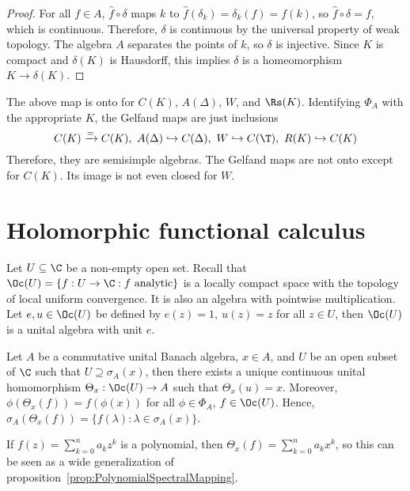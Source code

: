 \documentclass[a4paper]{article}
\begin{document}
\begin{proof}
  For all $f\in A$, $\hat{f}\circ\delta$ maps $k$ to $\hat{f}(\delta_k)=\delta_k(f)=f(k)$, so $\hat{f}\circ\delta=f$, which is continuous. Therefore, $\delta$ is continuous by the universal property of weak topology. The algebra $A$ separates the points of $k$, so $\delta$ is injective. Since $K$ is compact and $\delta(K)$ is Hausdorff, this implies $\delta$ is a homeomorphism $K\to\delta(K)$.
\end{proof}

\begin{eg}
  The above map is onto for $C(K)$, $A(\Delta)$, $W$, and $\Rs(K)$. Identifying $\Phi_A$ with the appropriate $K$, the Gelfand maps are just inclusions
  \[
    C(K)\xrightarrow{=} C(K),\ A(\Delta)\hookrightarrow C(\Delta),\ W\hookrightarrow C(\T),\ R(K)\hookrightarrow C(K)
  \]
Therefore, they are semisimple algebras. The Gelfand maps are not onto except for $C(K)$. Its image is not even closed for $W$.
\end{eg}

\newpage

\section{Holomorphic functional calculus}
Let $U\subseteq\C$ be a non-empty open set. Recall that $\Oc(U)=\{f:U\to\C:f\text{ analytic}\}$ is a locally compact space with the topology of local uniform convergence. It is also an algebra with pointwise multiplication. Let $e,u\in\Oc(U)$ be defined by $e(z)=1,\ u(z)=z$ for all $z\in U$, then $\Oc(U)$ is a unital algebra with unit $e$.

\begin{nthm}\label{thm:HFC}
  Let $A$ be a commutative unital Banach algebra, $x\in A$, and $U$ be an open subset of $\C$ such that $U\supseteq\sigma_A(x)$, then there exists a unique continuous unital homomorphism $\Theta_x:\Oc(U)\to A$ such that $\Theta_x(u)=x$. Moreover, $\phi(\Theta_x(f))=f(\phi(x))$ for all $\phi\in\Phi_A$, $f\in\Oc(U)$. Hence, $\sigma_A(\Theta_x(f))=\{f(\lambda):\lambda\in\sigma_A(x)\}$.
\end{nthm}

\begin{remark}
  If $f(z)=\sum_{k=0}^n a_k z^k$ is a polynomial, then $\Theta_x(f)=\sum_{k=0}^n a_kx^k$, so this can be seen as a wide generalization of proposition~\ref{prop:PolynomialSpectralMapping}.
\end{remark}
\end{document}
